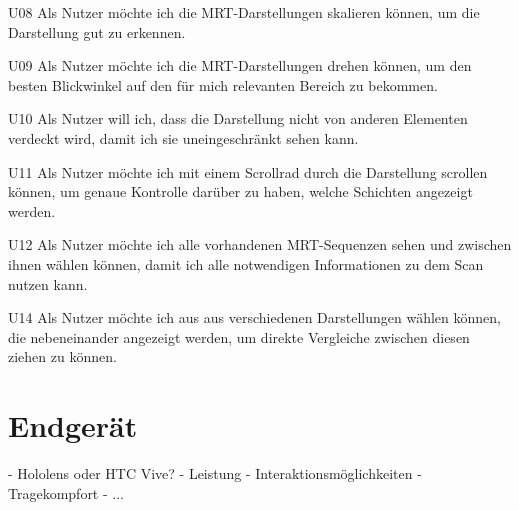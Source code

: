 U08 Als Nutzer möchte ich die MRT-Darstellungen skalieren können, um die Darstellung gut zu erkennen.

U09  Als Nutzer möchte ich die MRT-Darstellungen drehen können, um den besten Blickwinkel auf den für mich relevanten Bereich zu bekommen. 

U10  Als Nutzer will ich, dass die Darstellung nicht von anderen Elementen verdeckt wird, damit ich sie uneingeschränkt sehen kann. 

U11  Als Nutzer möchte ich mit einem Scrollrad durch die Darstellung scrollen können, um genaue Kontrolle darüber zu haben, welche Schichten angezeigt werden.

U12  Als Nutzer möchte ich alle vorhandenen MRT-Sequenzen sehen und zwischen ihnen wählen können, damit ich alle notwendigen Informationen zu dem Scan nutzen kann.  

U14  Als Nutzer möchte ich aus aus verschiedenen Darstellungen wählen können, die nebeneinander angezeigt werden, um direkte Vergleiche zwischen diesen ziehen zu können.

\section{Endgerät}

- Hololens oder HTC Vive?
- Leistung
- Interaktionsmöglichkeiten
- Tragekompfort
- ...